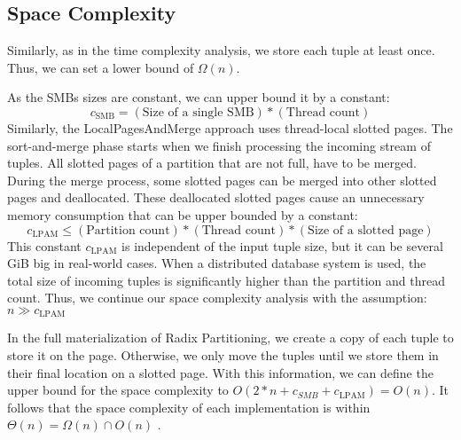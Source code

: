 \subsection{Space Complexity}\label{section-space-complexity}
Similarly, as in the time complexity analysis, we store each tuple at least once.
Thus, we can set a lower bound of $\Omega(n)$.

As the \acfp{SMB} sizes are constant, we can upper bound it by a constant:
\begin{equation}
  c_\textrm{SMB} = (\textrm{Size of a single SMB}) * (\textrm{Thread count})
\end{equation}
Similarly, the LocalPagesAndMerge approach uses thread-local slotted pages.
The sort-and-merge phase starts when we finish processing the incoming stream of tuples.
All slotted pages of a partition that are not full, have to be merged.
During the merge process, some slotted pages can be merged into other slotted pages and deallocated.
These deallocated slotted pages cause an unnecessary memory consumption that can be upper bounded by a constant:
\begin{equation}
  c_\textrm{LPAM} \leq (\textrm{Partition count}) * (\textrm{Thread count}) * (\textrm{Size of a slotted page})
\end{equation}
This constant $c_\textrm{LPAM}$ is independent of the input tuple size, but it can be several GiB big in real-world cases.
When a distributed database system is used, the total size of incoming tuples is significantly higher than the partition and thread count.
Thus, we continue our space complexity analysis with the assumption: $n \gg c_\textrm{LPAM} $

In the full materialization of Radix Partitioning, we create a copy of each tuple to store it on the page.
Otherwise, we only move the tuples until we store them in their final location on a slotted page.
With this information, we can define the upper bound for the space complexity to $O(2 * n + c_{SMB} + c_\textrm{LPAM}) = O(n)$.
It follows that the space complexity of each implementation is within $\Theta(n) = \Omega(n) \cap O(n) $ .
